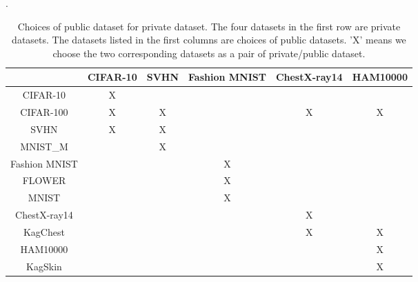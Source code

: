 \documentclass[11pt]{article}
\begin{document}
\begin{table*}[!h]
    \caption{Choices of public dataset for private dataset. The four datasets in the first row are private datasets. The datasets listed in the first columns are choices of public datasets. 'X' means we choose the two corresponding datasets as a pair of private/public dataset.}.
    \centering
    \begin{tabular}{c|ccccc}
     \hline
              & CIFAR-10 & SVHN & Fashion MNIST & ChestX-ray14 & HAM10000 \\ \hline
CIFAR-10      & X        &      &               &              &          \\
CIFAR-100     & X        & X    &               & X            & X        \\
SVHN          & X        & X    &               &              &          \\
MNIST\_M      &          & X    &               &              &          \\
Fashion MNIST &          &      & X             &              &          \\
FLOWER        &          &      & X             &              &          \\
MNIST         &          &      & X             &              &          \\
ChestX-ray14  &          &      &               & X            &          \\
KagChest      &          &      &               & X            & X        \\
HAM10000      &          &      &               &              & X         \\
KagSkin       &          &      &               &              & X        \\ \hline
\end{tabular}
\label{datasetchoice}
\end{table*}
\end{document}
